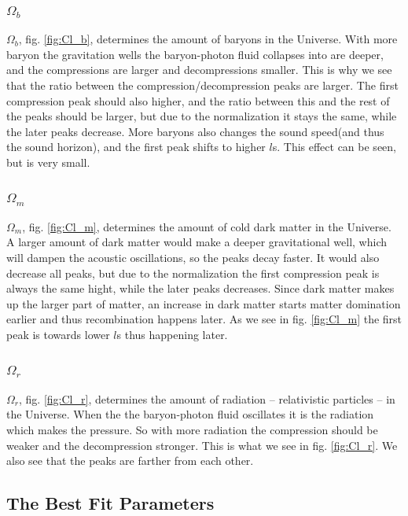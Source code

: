 \documentclass[a4paper,norsk, 10pt]{article}
\begin{document}
\subsubsection{$\Omega_b$}
$\Omega_b$, fig. \ref{fig:Cl_b}, determines the amount of baryons in the Universe. With more baryon the gravitation wells the baryon-photon fluid collapses into are deeper, and the compressions are larger and decompressions smaller. This is why we see that the ratio between the compression/decompression peaks are larger. The first compression peak should also higher, and the ratio between this and the rest of the peaks should be larger, but due to the normalization it stays the same, while the later peaks decrease. More baryons also changes the sound speed(and thus the sound horizon), and the first peak shifts to higher $l$s. This effect can be seen, but is very small.

\subsubsection{$\Omega_m$}
$\Omega_m$, fig. \ref{fig:Cl_m}, determines the amount of cold dark matter in the Universe. A larger amount of dark matter would make a deeper gravitational well, which will dampen the acoustic oscillations, so the peaks decay faster. It would also decrease all peaks, but due to the normalization the first compression peak is always the same hight, while the later peaks decreases. Since dark matter makes up the larger part of matter, an increase in dark matter starts matter domination earlier and thus recombination happens later. As we see in fig. \ref{fig:Cl_m} the first peak is towards lower $l$s thus happening	 later.

\subsubsection{$\Omega_r$}
$\Omega_r$, fig. \ref{fig:Cl_r}, determines the amount of radiation -- relativistic particles -- in the Universe. When the the baryon-photon fluid oscillates it is the radiation which makes the pressure. So with more radiation the compression should be weaker and the decompression stronger. This is what we see in fig. \ref{fig:Cl_r}. We also see that the peaks are farther from each other.

\subsection{The Best Fit Parameters}
\end{document}
